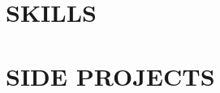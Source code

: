 \documentclass[10.5pt,letterpaper]{article}
\begin{document}
\section{\faDatabase{ }SKILLS}
\vspace{4pt}

\vspace{-20pt}

\section{\faFolderOpen{ }SIDE PROJECTS}
\vspace{4pt}





\end{document}
